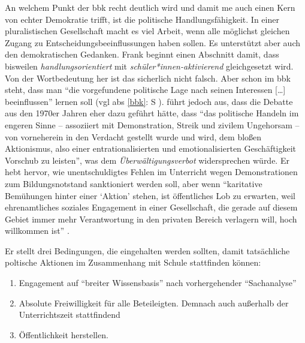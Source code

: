An welchem Punkt der \gls{bbk} recht deutlich wird und damit \gls{me} auch einen Kern von echter Demokratie trifft, ist die politische Handlungsfähigkeit. In einer pluralistischen Gesellschaft macht es viel Arbeit, wenn alle möglichst gleichen Zugang zu Entscheidungsbeeinflussungen haben sollen. Es unterstützt aber auch den demokratischen Gedanken. 
Frank \textcite[466]{Nonnenmacher2010} beginnt einen Abschnitt damit, dass bisweilen \emph{handlungsorientiert} mit \emph{schüler*innen-aktivierend} gleichgesetzt wird. Von der Wortbedeutung her ist das sicherlich nicht falsch. Aber schon im \gls{bbk} steht, dass man \enquote{die vorgefundene politische Lage nach seinen %
Interessen [\dots] beeinflussen} lernen soll (\gls{vgl} \gls{abs} \ref{bbk}: \gls{S} \pageref{bbk}). \textcite[466-467]{Nonnenmacher2010} führt jedoch aus, dass die Debatte aus den 1970er Jahren eher dazu geführt hätte, dass \enquote{das politische Handeln im engeren Sinne -- assoziiert mit Demonstration, Streik und zivilem Ungehorsam -- von vorneherein in den Verdacht gestellt wurde und wird, dem bloßen Aktionismus, also einer entrationalisierten und emotionalisierten Geschäftigkeit Vorschub zu leisten}, was dem \emph{Überwältigungsverbot} widersprechen würde.
Er hebt hervor, wie unentschuldigtes Fehlen im Unterricht wegen Demonstrationen zum Bildungsnotstand sanktioniert werden soll, aber wenn \enquote{karitative Bemühungen hinter einer \enquote{Aktion} stehen, ist öffentliches Lob zu erwarten, weil ehrenamtliches soziales Engagement in einer Gesellschaft, die gerade auf diesem Gebiet immer mehr Verantwortung in den privaten Bereich verlagern will, hoch willkommen ist} \autocite[467]{Nonnenmacher2010}.

Er stellt drei Bedingungen, die eingehalten werden sollten, damit tatsächliche poltische Aktionen im Zusammenhang mit Schule stattfinden können:
\begin{enumerate}
    \item Engagement auf \enquote{breiter Wissensbasis} nach vorhergehender \enquote{Sachanalyse}
    \item Absolute Freiwilligkeit für alle Beteileigten. Demnach auch außerhalb der Unterrichtszeit stattfindend
    \item Öffentlichkeit herstellen. %
    
    \autocite[467]{Nonnenmacher2010}
\end{enumerate}


